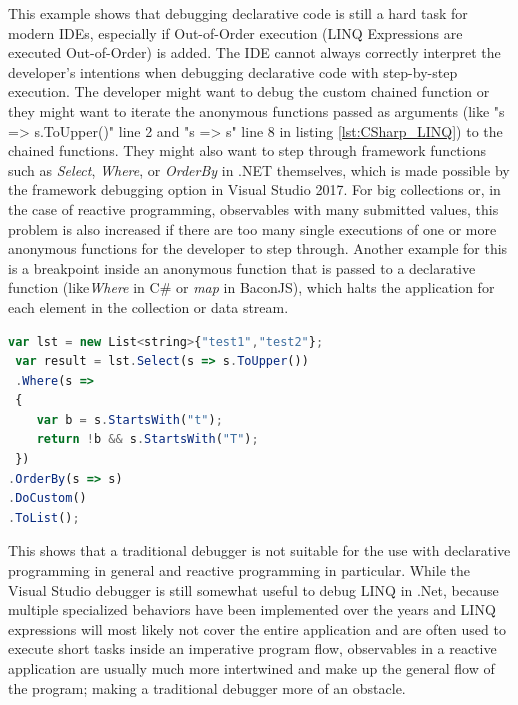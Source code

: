 This example shows that debugging declarative code is still a hard task for modern IDEs, especially if Out-of-Order execution (LINQ Expressions are executed Out-of-Order) is added. The IDE cannot always correctly interpret the developer's intentions when debugging declarative code with step-by-step execution. The developer might want to debug the custom chained function or they might want to iterate the anonymous functions passed as arguments (like "s => s.ToUpper()" line 2 and "s => s" line 8 in listing \ref{lst:CSharp_LINQ}) to the chained functions. They might also want to step through framework functions such as \emph{Select}, \emph{Where}, or \emph{OrderBy} in .NET themselves, which is made possible by the framework debugging option in Visual Studio 2017. 
For big collections or, in the case of reactive programming, observables with many submitted values, this problem is also increased if there are too many single executions of one or more anonymous functions for the developer to step through. Another example for this is a breakpoint inside an anonymous function that is passed to a declarative function (like\emph{Where} in C\# or \emph{map} in BaconJS), which halts the application for each element in the collection or data stream.

\begin{lstlisting}[language=JavaScript, caption={Simple example of .NET LINQ in C\# to show the steps the Visual Studio 2017 for .NET debugger takes while debugging step-by-step.},label={lst:CSharp_LINQ}]
 var lst = new List<string>{"test1","test2"};
 var result = lst.Select(s => s.ToUpper())
 .Where(s =>
 {
	var b = s.StartsWith("t");
	return !b && s.StartsWith("T");
 })
.OrderBy(s => s)
.DoCustom()
.ToList();
\end{lstlisting}

This shows that a traditional debugger is not suitable for the use with declarative programming in general and reactive programming in particular. While the Visual Studio debugger is still somewhat useful to debug LINQ in .Net, because multiple specialized behaviors have been implemented over the years and LINQ expressions will most likely not cover the entire application and are often used to execute short tasks inside an imperative program flow, observables in a reactive application are usually much more intertwined and make up the general flow of the program; making a traditional debugger more of an obstacle.

